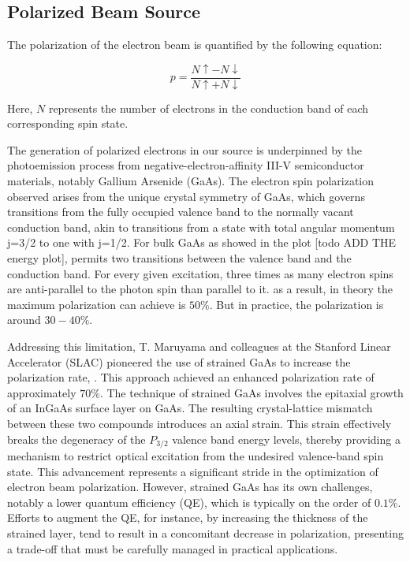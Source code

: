 \subsection{Polarized Beam Source}

The polarization of the electron beam is quantified by the following equation:

\begin{equation}
p = \frac{N{\uparrow} - N{\downarrow}}{N{\uparrow} + N{\downarrow}}
\end{equation}

Here, $N$ represents the number of electrons in the conduction band of each corresponding spin state. 

The generation of polarized electrons in our source is underpinned by the photoemission process from negative-electron-affinity III-V semiconductor materials, notably Gallium Arsenide (GaAs). The electron spin polarization observed arises from the unique crystal symmetry of GaAs, which governs transitions from the fully occupied valence band to the normally vacant conduction band, akin to transitions from a state with total angular momentum j=3/2 to one with j=1/2. For bulk GaAs as showed in the plot [todo ADD THE energy plot], permits two transitions between the valence band and the conduction band. For every given excitation, three times as many electron spins are anti-parallel to the photon spin than parallel to it. as a result, in theory the maximum polarization can achieve is $50\%$. But in practice, the polarization is around $30-40\%$. 


Addressing this limitation, T. Maruyama and colleagues at the Stanford Linear Accelerator (SLAC) pioneered the use of strained GaAs to increase the polarization rate, \cite{PhysRevLett.66.2376}. This approach achieved an enhanced polarization rate of approximately $70\%$. The technique of strained GaAs involves the epitaxial growth of an InGaAs surface layer on GaAs. The resulting crystal-lattice mismatch between these two compounds introduces an axial strain. This strain effectively breaks the degeneracy of the $P_{3/2}$ valence band energy levels, thereby providing a mechanism to restrict optical excitation from the undesired valence-band spin state. This advancement represents a significant stride in the optimization of electron beam polarization. However, strained GaAs has its own challenges, notably a lower quantum efficiency (QE), which is typically on the order of $0.1\%$. Efforts to augment the QE, for instance, by increasing the thickness of the strained layer, tend to result in a concomitant decrease in polarization, presenting a trade-off that must be carefully managed in practical applications.

